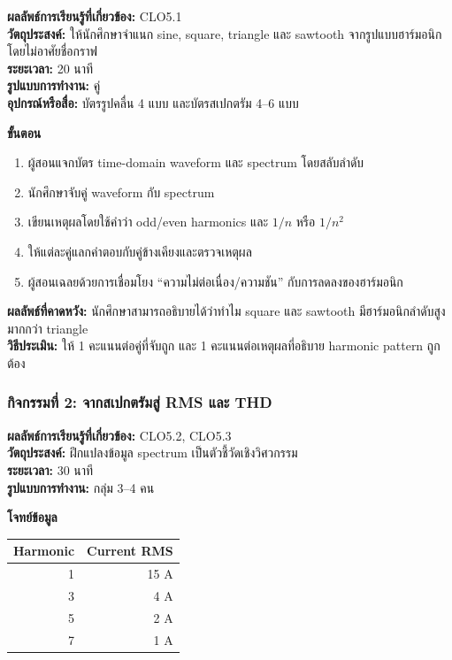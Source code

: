\textbf{ผลลัพธ์การเรียนรู้ที่เกี่ยวข้อง:} CLO5.1 \\
\textbf{วัตถุประสงค์:} ให้นักศึกษาจำแนก sine, square, triangle และ sawtooth จากรูปแบบฮาร์มอนิกโดยไม่อาศัยชื่อกราฟ \\
\textbf{ระยะเวลา:} 20 นาที \\
\textbf{รูปแบบการทำงาน:} คู่ \\
\textbf{อุปกรณ์หรือสื่อ:} บัตรรูปคลื่น 4 แบบ และบัตรสเปกตรัม 4–6 แบบ

\textbf{ขั้นตอน}

\begin{enumerate}
    \item ผู้สอนแจกบัตร time-domain waveform และ spectrum โดยสลับลำดับ
    \item นักศึกษาจับคู่ waveform กับ spectrum
    \item เขียนเหตุผลโดยใช้คำว่า odd/even harmonics และ $1/n$ หรือ $1/n^2$
    \item ให้แต่ละคู่แลกคำตอบกับคู่ข้างเคียงและตรวจเหตุผล
    \item ผู้สอนเฉลยด้วยการเชื่อมโยง “ความไม่ต่อเนื่อง/ความชัน” กับการลดลงของฮาร์มอนิก
\end{enumerate}

\textbf{ผลลัพธ์ที่คาดหวัง:} นักศึกษาสามารถอธิบายได้ว่าทำไม square และ sawtooth มีฮาร์มอนิกลำดับสูงมากกว่า triangle \\
\textbf{วิธีประเมิน:} ให้ 1 คะแนนต่อคู่ที่จับถูก และ 1 คะแนนต่อเหตุผลที่อธิบาย harmonic pattern ถูกต้อง

\subsubsection{กิจกรรมที่ 2: จากสเปกตรัมสู่ RMS และ THD}

\textbf{ผลลัพธ์การเรียนรู้ที่เกี่ยวข้อง:} CLO5.2, CLO5.3 \\
\textbf{วัตถุประสงค์:} ฝึกแปลงข้อมูล spectrum เป็นตัวชี้วัดเชิงวิศวกรรม \\
\textbf{ระยะเวลา:} 30 นาที \\
\textbf{รูปแบบการทำงาน:} กลุ่ม 3–4 คน

\textbf{โจทย์ข้อมูล}

\begin{table}[htbp]
    \centering
    \begin{tabular}{r r}
        \hline
        \textbf{Harmonic} & \textbf{Current RMS} \\
        \hline
        1 & 15 A \\
        3 & 4 A \\
        5 & 2 A \\
        7 & 1 A \\
        \hline
    \end{tabular}
\end{table}


